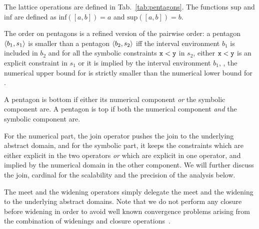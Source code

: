 \documentclass{sig-alternate}
\begin{document}
The lattice operations are defined in Tab.~\ref{tab:pentagons}.
The functions $\mathrm{sup}$ and $\mathrm{inf}$ are defined as  $\mathrm{inf}([a,b]) = a$ and $\mathrm{sup}([a,b]) = b$.

The order on pentagons is a refined version of the pairwise order: a pentagon $\langle b_1, s_1 \rangle$ is smaller than a pentagon $\langle b_2, s_2 \rangle$ iff the interval environment $b_1$ is included in $b_2$ and for all the symbolic constraints $\mathtt{x} < \mathtt{y}$ in $s_2$, either $\mathtt{x} < \mathtt{y}$ is an explicit constraint in $s_1$ or it is implied by the interval environment $b_1$, \ie, the numerical upper bound for  is strictly smaller than the numerical lower bound for .

A pentagon is bottom if either its numerical component \emph{or} the symbolic component are.
A pentagon is top if both the numerical component \emph{and} the symbolic component are.

For the numerical part, the join operator pushes the join to the underlying \Intervals{} abstract domain, and for the symbolic part, it keeps the constraints which are either explicit in the two operators \emph{or} which are explicit in one operator, and implied by the numerical domain in the other component. 
We will further discuss the join, cardinal for the scalability and the precision of the analysis below.

The meet and the widening operators simply delegate the meet and the widening to the underlying abstract domains.
Note that we do not perform any closure before widening in order to
avoid well known convergence problems arising from the combination of widenings and closure operations~\cite{Mine01-2}.
\end{document}
